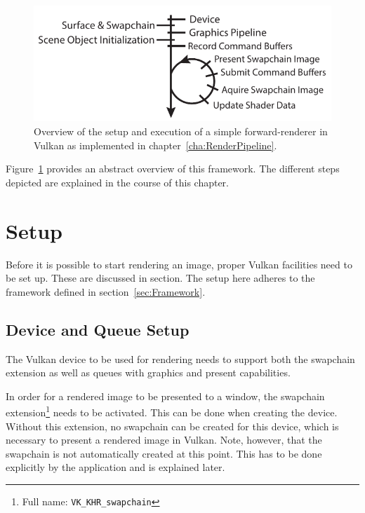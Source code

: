   \begin{figure}
    \includegraphics{Main/Images/RenderSetupAndLoopSimple}
    \centering
    \caption{Overview of the setup and execution of a simple forward-renderer in Vulkan as implemented in chapter~\ref{cha:RenderPipeline}.}
    \label{fig:RenderSetupAndLoopSimple}
  \end{figure}

  Figure~\ref{fig:RenderSetupAndLoopSimple} provides an abstract overview of this framework.
  The different steps depicted are explained in the course of this chapter.


  \section{Setup}
  \label{sec:RenderingSetup}
    Before it is possible to start rendering an image, proper Vulkan facilities need to be set up.
    These are discussed in section.
    The setup here adheres to the framework defined in section~\ref{sec:Framework}.

    \subsection{Device and Queue Setup}
      The Vulkan device to be used for rendering needs to support both the swapchain extension as well as queues with graphics and present capabilities.

      In order for a rendered image to be presented to a window, the swapchain extension\footnote{Full name: \lstinline{VK_KHR_swapchain}} needs to be activated.
      This can be done when creating the device.
      Without this extension, no swapchain can be created for this device, which is necessary to present a rendered image in Vulkan.
      Note, however, that the swapchain is not automatically created at this point.
      This has to be done explicitly by the application and is explained later.

